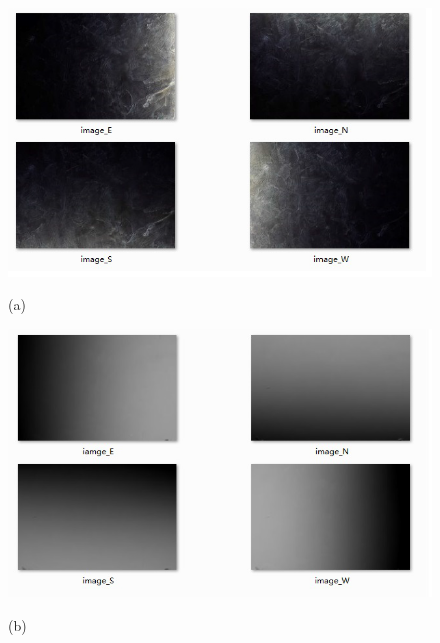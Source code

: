 \begin{figure}[htbp]

\begin{minipage}{0.5\linewidth}
\centerline{\includegraphics[width=1\linewidth]{figures/gaungxiansunshia.png}}
\centerline{(a)}
\end{minipage}
\begin{minipage}{0.5\linewidth}
\centerline{\includegraphics[width=1\linewidth]{figures/gaungxiansunshib.png}}
\centerline{(b)}
\end{minipage}


\end{figure}
